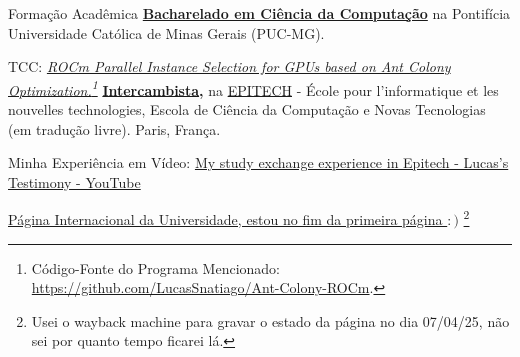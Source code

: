 \begin{rubric}{Formação Acadêmica}
\entry*[2019 -- 2023]%
    \textbf{\href{https://drive.google.com/file/d/1c2m8jONNZnZUBY8lnjcAZ_gO1ZWcIsyu/view?usp=sharing}{Bacharelado em Ciência da Computação}} na Pontifícia Universidade Católica de Minas Gerais (PUC-MG).
    \par TCC: \emph{\href{https://media.githubusercontent.com/media/LucasSnatiago/TCC/main/main.pdf}
    {ROCm Parallel Instance Selection for GPUs based on Ant Colony Optimization.}\footnote{Código-Fonte do Programa Mencionado: \href{https://github.com/LucasSnatiago/Ant-Colony-ROCm}{https://github.com/LucasSnatiago/Ant-Colony-ROCm}.}}
%
\entry*[2023/1]%
    \textbf{\href{https://drive.google.com/file/d/18yGVDfS8qOwmM7TXN-m8jqI3r0iMvm-3/view?usp=sharing}{Intercambista},} na \href{https://epitech.eu/}{EPITECH} - École pour l'informatique et les nouvelles technologies, Escola de Ciência da Computação e Novas Tecnologias (em tradução livre). Paris, França. \par
    Minha Experiência em Vídeo: \href{https://youtu.be/rOP5lxGcNaE}{My study exchange experience in Epitech - Lucas's Testimony - YouTube} \par
    \href{https://web.archive.org/web/20250407145959/https://international.epitech.eu/#h-voices-of-our-international-students}{Página Internacional da Universidade, estou no fim da primeira página $:)$}
    \footnote{Usei o wayback machine para gravar o estado da página no dia 07/04/25, não sei por quanto tempo ficarei lá.}
%
\end{rubric}
